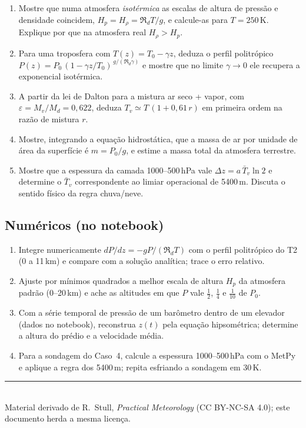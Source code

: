 \documentclass[11pt]{article}
\begin{document}
\begin{enumerate}[label=\textbf{T\arabic*.},itemsep=4pt]
  \item Mostre que numa atmosfera \emph{isotérmica} as escalas de altura de
        pressão e densidade coincidem, $H_p = H_\rho = \Re_d T/g$, e
        calcule-as para $T=250$\,K. Explique por que na atmosfera real
        $H_\rho > H_p$.
  \item Para uma troposfera com $T(z)=T_0-\gamma z$, deduza o perfil
        politrópico
        $P(z)=P_0\,(1-\gamma z/T_0)^{\,g/(\Re_d\gamma)}$
        e mostre que no limite $\gamma\to0$ ele recupera a exponencial
        isotérmica.
  \item A partir da lei de Dalton para a mistura ar seco + vapor, com
        $\varepsilon = M_v/M_d = 0{,}622$, deduza
        $T_v \simeq T\,(1+0{,}61\,r)$ em primeira ordem na razão de mistura
        $r$.
  \item Mostre, integrando a equação hidrostática, que a massa de ar por
        unidade de área da superfície é $m = P_0/g$, e estime a massa total
        da atmosfera terrestre.
  \item Mostre que a espessura da camada 1000--500\,hPa vale
        $\Delta z = a\,\bar T_v \ln 2$ e determine o $\bar T_v$
        correspondente ao limiar operacional de 5400\,m. Discuta o sentido
        físico da regra chuva/neve.
\end{enumerate}

\subsection*{Numéricos (no notebook)}

\begin{enumerate}[label=\textbf{N\arabic*.},itemsep=4pt]
  \item Integre numericamente $dP/dz = -gP/(\Re_d T)$ com o perfil
        politrópico do T2 (0 a 11\,km) e compare com a solução analítica;
        trace o erro relativo.
  \item Ajuste por mínimos quadrados a melhor escala de altura $H_p$ da
        atmosfera padrão (0--20\,km) e ache as altitudes em que $P$ vale
        $\tfrac12$, $\tfrac14$ e $\tfrac1{10}$ de $P_0$.
  \item Com a série temporal de pressão de um barômetro dentro de um
        elevador (dados no notebook), reconstrua $z(t)$ pela equação
        hipsométrica; determine a altura do prédio e a velocidade média.
  \item Para a sondagem do Caso~4, calcule a espessura 1000--500\,hPa com o
        MetPy e aplique a regra dos 5400\,m; repita esfriando a sondagem em
        30\,K.
\end{enumerate}

\vspace{1em}
\noindent\rule{\linewidth}{0.4pt}\\
{\scriptsize Material derivado de R.~Stull, \emph{Practical Meteorology}
(CC BY-NC-SA 4.0); este documento herda a mesma licença.}
\end{document}
